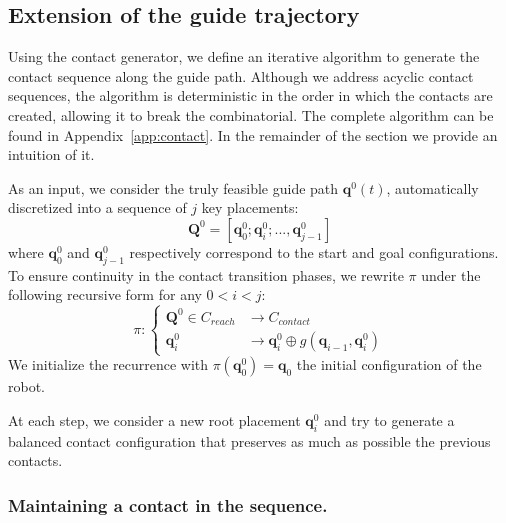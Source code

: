 \subsection{Extension of the guide trajectory}
Using the contact generator, we define an iterative algorithm to generate the contact
sequence along the guide path.
Although we address acyclic contact sequences, the algorithm is deterministic in the order in which 
the contacts are created, allowing it to break the combinatorial.
The complete algorithm can be found in Appendix~\ref{app:contact}.
In the remainder of the section we provide an intuition of it.

As an input, we consider the truly feasible guide path $\mathbf{q}^0(t)$, automatically discretized into a sequence of $j$ key placements:  
\begin{equation*}
	\mathbf{Q}^0 = [\mathbf{q}^0_{0}; \mathbf{q}^0_{i}; ..., \mathbf{q}^0_{j-1}]
\end{equation*} 
where $\mathbf{q}^0_{0}$ and $\mathbf{q}^0_{j-1}$ respectively correspond to the start and goal configurations. To ensure continuity in the contact transition phases, we rewrite $\pi$ under the following recursive form for any $0<i<j$:
\begin{equation*}
    \pi\colon\left\{
    \begin{aligned}		
        \mathbf{Q}^0 \in C_{reach} & \longrightarrow C_{contact} \\
        \mathbf{q}^{0}_i &  \longrightarrow  \mathbf{q}^{0}_i \oplus g(\mathbf{q}_{i - 1},\mathbf{q}^{0}_i) 
    \end{aligned}
    \right.
\end{equation*} 
We initialize the recurrence with $\pi(\mathbf{q}^0_{0}) = \mathbf{q}_0$ the initial configuration of the robot.

At each step, we consider a new root placement $\mathbf{q}^0_{i}$ and try to generate a balanced contact configuration that preserves as much as possible
the previous contacts.


\subsubsection{Maintaining a contact in the sequence.}

